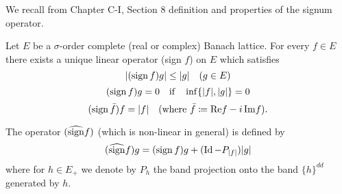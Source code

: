 We recall from Chapter C-I, Section 8 definition and properties of the signum operator.
\begin{proposition}\label{prop:c2-2.1}
Let $E$ be a $\sigma$-order complete (real or complex) Banach lattice.
For every $f \in E$ there exists a unique linear operator (sign $f$) on $E$ which satisfies
\begin{equation}\label{eq:c2-2.1}
	|(\operatorname{sign} f)g| \leq |g| \quad (g \in E)
\end{equation}
\begin{equation}\label{eq:c2-2.2}
(\operatorname{sign} f)g = 0 \quad \text{if} \quad \inf\{|f|,|g|\} = 0
\end{equation}
\begin{equation}\label{eq:c2-2.3}
(\operatorname{sign} \bar{f})f = |f| \quad \text{(where } \bar{f} \coloneqq \mathop{}\!\mathrm{Re} f - i\mathop{}\!\mathrm{Im} f \text{)}.
\end{equation}
\end{proposition}
The operator $(\widehat{\operatorname{sign}} f)$ (which is non-linear in general) is defined by
\begin{equation}\label{eq:c2-2.4}
(\widehat{\operatorname{sign}}f)g = (\operatorname{sign} f)g + (\operatorname{Id} - P_{|f|})|g|
\end{equation}
where for $h \in E_{+}$ we denote by $P_h$ the band projection onto the band $\{h\}^{dd}$ generated by $h$.

